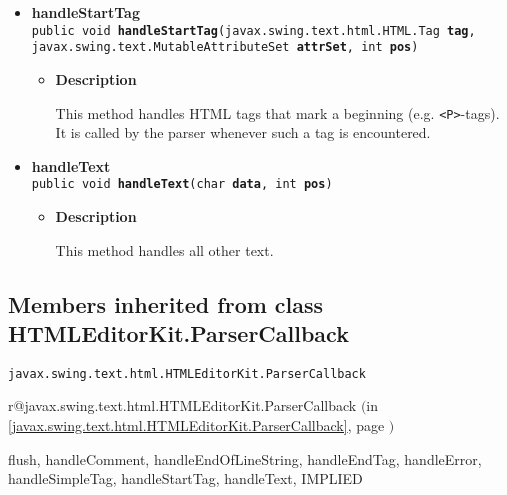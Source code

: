 \documentclass[11pt,a4paper]{report}
\makeatletter
\newcommand{\refdefined}[1]{
\expandafter\ifx\csname r@#1\endcsname\relax
\relax\else
{$($in \ref{#1}, page \pageref{#1}$)$}\fi}
\makeatother
\begin{document}
{\begin{itemize}
{\begin{itemize}
{This method handles simple HTML tags (e.g. \texttt{\small \textless HR\textgreater }-tags). It is called by the parser whenever such a tag is encountered.
}
\end{itemize}
}%
\item{ 
\hypertarget{org.stfm.texdoclet.HTMLtoLaTeXBackEnd.handleStartTag(javax.swing.text.html.HTML.Tag, javax.swing.text.MutableAttributeSet, int)}{{\bf  handleStartTag}\\}
\texttt{public void\ {\bf  handleStartTag}(\texttt{javax.swing.text.html.HTML.Tag} {\bf  tag},
\texttt{javax.swing.text.MutableAttributeSet} {\bf  attrSet},
\texttt{int} {\bf  pos})
\label{org.stfm.texdoclet.HTMLtoLaTeXBackEnd.handleStartTag(javax.swing.text.html.HTML.Tag, javax.swing.text.MutableAttributeSet, int)}}%
\begin{itemize}
\item{
{\bf  Description}

This method handles HTML tags that mark a beginning (e.g. \texttt{\small \textless P\textgreater }-tags). It is called by the parser whenever such a tag is encountered.
}
\end{itemize}
}%
\item{ 
\hypertarget{org.stfm.texdoclet.HTMLtoLaTeXBackEnd.handleText(char[], int)}{{\bf  handleText}\\}
\texttt{public void\ {\bf  handleText}(\texttt{char\lbrack \rbrack } {\bf  data},
\texttt{int} {\bf  pos})
\label{org.stfm.texdoclet.HTMLtoLaTeXBackEnd.handleText(char[], int)}}%
\begin{itemize}
\item{
{\bf  Description}

This method handles all other text.
}
\end{itemize}
}%
\end{itemize}
}
\subsection{Members inherited from class HTMLEditorKit.ParserCallback }{
\texttt{javax.swing.text.html.HTMLEditorKit.ParserCallback} {\small 
\refdefined{javax.swing.text.html.HTMLEditorKit.ParserCallback}}
{\small 

flush, handleComment, handleEndOfLineString, handleEndTag, handleError, handleSimpleTag, handleStartTag, handleText, IMPLIED}
}
\end{document}
